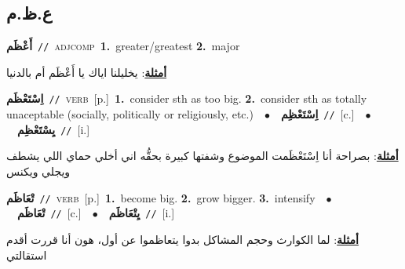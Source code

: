 \documentclass[10pt,a4paper,twoside]{article} %
\begin{document}
\begin{multicols}{2}
\vspace{-3mm}
\subsection*{\color{blue}\foreignlanguage{arabic}{ع.ظ.م}\color{blue}{}} 

{\setlength\topsep{0pt}\textbf{\foreignlanguage{arabic}{أَعْظَم}}\ {\color{gray}\texttt{//}\color{black}}\ \textsc{adj\textunderscore comp}\ \textbf{1.}~greater/greatest  \textbf{2.}~major\  \begin{flushright}\color{gray}\foreignlanguage{arabic}{\textbf{\underline{\foreignlanguage{arabic}{أمثلة}}}: يخليلنا اياك يا أَعْظَم أم بالدنيا}\end{flushright}\color{black}} \vspace{2mm}

{\setlength\topsep{0pt}\textbf{\foreignlanguage{arabic}{اِسْتَعْظَم}}\ {\color{gray}\texttt{//}\color{black}}\ \textsc{verb}\ [p.]\ \textbf{1.}~consider sth as too big.  \textbf{2.}~consider sth as totally unaceptable (socially, politically or religiously, etc.)\ \ $\bullet$\ \ \setlength\topsep{0pt}\textbf{\foreignlanguage{arabic}{اِسْتَعْظِم}}\ {\color{gray}\texttt{//}\color{black}}\ [c.]\ \ $\bullet$\ \ \setlength\topsep{0pt}\textbf{\foreignlanguage{arabic}{يِسْتَعْظِم}}\ {\color{gray}\texttt{//}\color{black}}\ [i.]\  \begin{flushright}\color{gray}\foreignlanguage{arabic}{\textbf{\underline{\foreignlanguage{arabic}{أمثلة}}}: بصراحة أنا اِسْتَعْظَمت الموضوع وشفتها كبيرة بحقُّه اني أخلي حماي اللي يشطف ويجلي ويكنس}\end{flushright}\color{black}} \vspace{2mm}

{\setlength\topsep{0pt}\textbf{\foreignlanguage{arabic}{تْعَاظَم}}\ {\color{gray}\texttt{//}\color{black}}\ \textsc{verb}\ [p.]\ \textbf{1.}~become big.  \textbf{2.}~grow bigger.  \textbf{3.}~intensify\ \ $\bullet$\ \ \setlength\topsep{0pt}\textbf{\foreignlanguage{arabic}{تْعَاظَم}}\ {\color{gray}\texttt{//}\color{black}}\ [c.]\ \ $\bullet$\ \ \setlength\topsep{0pt}\textbf{\foreignlanguage{arabic}{يِتْعَاظَم}}\ {\color{gray}\texttt{//}\color{black}}\ [i.]\  \begin{flushright}\color{gray}\foreignlanguage{arabic}{\textbf{\underline{\foreignlanguage{arabic}{أمثلة}}}: لما الكوارث وحجم المشاكل بدوا يتعاظموا عن أول، هون أنا قررت أقدم استقالتي}\end{flushright}\color{black}} \vspace{2mm}


\end{multicols}
\end{document}
